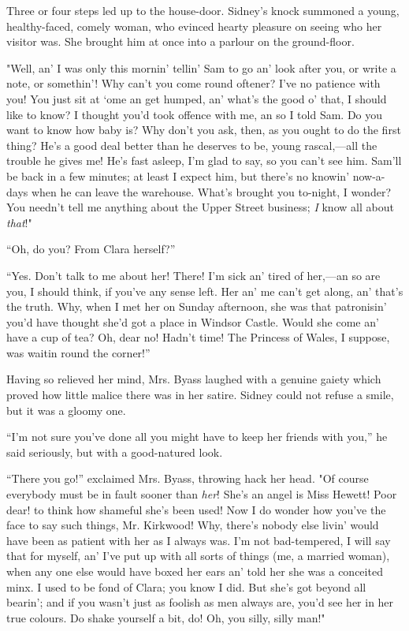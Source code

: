 Three or four steps led up to the house-door. Sidney's knock summoned a
young, healthy-faced, comely woman, who evinced hearty pleasure on
seeing who her visitor was. She brought him at once into a parlour on
the ground-floor.

"Well, an' I was only this mornin' tellin' Sam to go an' look after you,
or write a note, or somethin'! Why can't you come round oftener? I've no
patience with you! You just sit at `ome an get humped, an' what's the
good o' that, I should like to know? I thought you'd took offence with
me, an so I told Sam. Do you want to know how baby is? Why don't you
ask, then, as you ought to do the first thing? He's a good deal better
than he deserves to be, young rascal,---all the trouble he gives me!
He's fast {}asleep, I'm glad to say, so you can't see him. Sam'll be
back in a few minutes; at least I expect him, but there's no knowin'
now-a-days when he can leave the warehouse. What's brought you to-night,
I wonder? You needn't tell me anything about the Upper Street business;
\emph{I} know all about \emph{that}!"

``Oh, do you? From Clara herself?''

``Yes. Don't talk to me about her! There! I'm sick an' tired of
her,---an so are you, I should think, if you've any sense left. Her an'
me can't get along, an' that's the truth. Why, when I met her on Sunday
afternoon, she was that patronisin' you'd have thought she'd got a place
in Windsor Castle. Would she come an' have a cup of tea? Oh, dear no!
Hadn't time! The Princess of Wales, I suppose, was waitin round the
corner!''

Having so relieved her mind, Mrs. Byass laughed with a genuine gaiety
which proved how little malice there was in her satire. Sidney could not
refuse a smile, but it was a gloomy one.

{}``I'm not sure you've done all you might have to keep her friends with
you,'' he said seriously, but with a good-natured look.

``There you go!'' exclaimed Mrs. Byass, throwing hack her head. "Of
course everybody must be in fault sooner than \emph{her}! She's an angel
is Miss Hewett! Poor dear! to think how shameful she's been used! Now I
do wonder how you've the face to say such things, Mr. Kirkwood! Why,
there's nobody else livin' would have been as patient with her as I
always was. I'm not bad-tempered, I will say that for myself, an' I've
put up with all sorts of things (me, a married woman), when any one else
would have boxed her ears an' told her she was a conceited minx. I used
to be fond of Clara; you know I did. But she's got beyond all bearin';
and if you wasn't just as foolish as men always are, you'd see her in
her true colours. Do shake yourself a bit, do! Oh, you silly, silly
man!"

